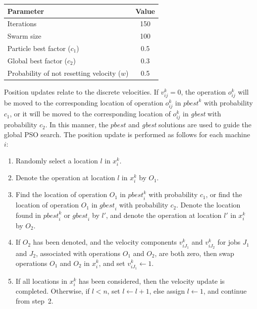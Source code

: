 \documentclass[paper=a4, fontsize=9pt]{scrartcl}
\begin{document}
\begin{multicols}{2}
{
\vspace{0.2cm}
\begin{minipage}{\linewidth{}}
\centering
\begin{tabular}{lc}
\toprule
Parameter                                   & Value \\
\midrule
Iterations                                  & 150   \\
Swarm size                                  & 100   \\
Particle best factor ($c_1$)                &   0.5 \\
Global best factor ($c_2$)                  &   0.3 \\
Probability of not resetting velocity ($w$) &   0.5 \\
\bottomrule
\end{tabular}
\vspace{-0.2cm}
\label{table:psoparams}
\end{minipage}
}

Position updates relate to the discrete velocities. If $v_{ij}^k=0$, the operation $o_{ij}^k$ will be moved to the corresponding location of operation $o_{ij}^k$ in $\textit{pbest}^k$ with probability $c_1$, or it will be moved to the corresponding location of $o_{ij}^k$ in \textit{gbest} with probability $c_2$. In this manner, the $\textit{pbest}$ and \textit{gbest} solutions are used to guide the global \ac{PSO} search. The position update is performed as follows for each machine $i$:

\begin{enumerate}
    \item Randomly select a location $l$ in $x_i^k$.
    \item Denote the operation at location $l$ in $x_i^k$ by $O_1$.
    \item Find the location of operation $O_1$ in $\textit{pbest}_i^k$ with probability $c_1$, or find the location of operation $O_1$ in $\textit{gbest}_i$ with probability $c_2$. Denote the location found in $\textit{pbest}_i^k$ or $\textit{gbest}_i$ by $l'$, and denote the operation at location $l'$ in $x_i^k$ by $O_2$.
    \item If $O_2$ has been denoted, and the velocity components $v_{i{J_1}}^k$ and $v_{i{J_2}}^k$ for jobs $J_1$ and $J_2$, associated with operations $O_1$ and $O_2$, are both zero, then swap operations $O_1$ and $O_2$ in $x_i^k$, and set $v_{i{J_1}}^k \gets 1$.
    \item If all locations in $x_i^k$ has been considered, then the velocity update is completed. Otherwise, if $l<n$, set $l \gets l+1$, else assign $l \gets 1$, and continue from step~2.
\end{enumerate}


\end{multicols}
\end{document}
